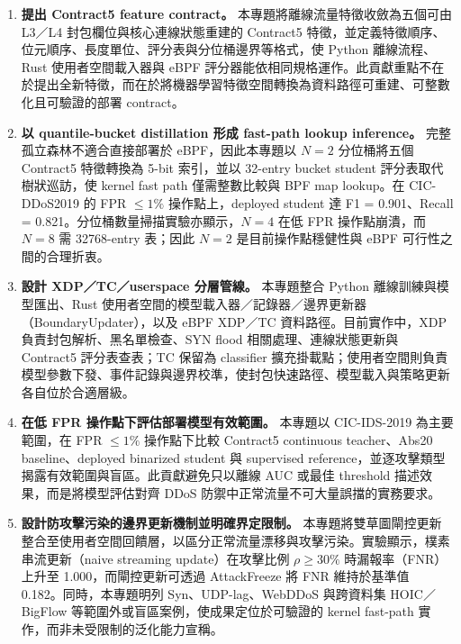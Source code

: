 \documentclass[12pt, a4paper, fontset=none]{ctexart}
\begin{document}
\begin{enumerate}
  \item \textbf{提出 Contract5 feature contract。} 本專題將離線流量特徵收斂為五個可由 L3／L4 封包欄位與核心連線狀態重建的 Contract5 特徵，並定義特徵順序、位元順序、長度單位、評分表與分位桶邊界等格式，使 Python 離線流程、Rust 使用者空間載入器與 eBPF 評分器能依相同規格運作。此貢獻重點不在於提出全新特徵，而在於將機器學習特徵空間轉換為資料路徑可重建、可整數化且可驗證的部署 contract。

  \item \textbf{以 quantile-bucket distillation 形成 fast-path lookup inference。} 完整孤立森林不適合直接部署於 eBPF，因此本專題以 $N=2$ 分位桶將五個 Contract5 特徵轉換為 5-bit 索引，並以 32-entry bucket student 評分表取代樹狀巡訪，使 kernel fast path 僅需整數比較與 BPF map lookup。在 CIC-DDoS2019 的 FPR $\leq 1\%$ 操作點上，deployed student 達 F1 = 0.901、Recall = 0.821。分位桶數量掃描實驗亦顯示，$N=4$ 在低 FPR 操作點崩潰，而 $N=8$ 需 32768-entry 表；因此 $N=2$ 是目前操作點穩健性與 eBPF 可行性之間的合理折衷。

  \item \textbf{設計 XDP／TC／userspace 分層管線。} 本專題整合 Python 離線訓練與模型匯出、Rust 使用者空間的模型載入器／記錄器／邊界更新器（BoundaryUpdater），以及 eBPF XDP／TC 資料路徑。目前實作中，XDP 負責封包解析、黑名單檢查、SYN flood 相關處理、連線狀態更新與 Contract5 評分表查表；TC 保留為 classifier 擴充掛載點；使用者空間則負責模型參數下發、事件記錄與邊界校準，使封包快速路徑、模型載入與策略更新各自位於合適層級。

  \item \textbf{在低 FPR 操作點下評估部署模型有效範圍。} 本專題以 CIC-IDS-2019 為主要範圍，在 FPR $\leq 1\%$ 操作點下比較 Contract5 continuous teacher、Abs20 baseline、deployed binarized student 與 supervised reference，並逐攻擊類型揭露有效範圍與盲區。此貢獻避免只以離線 AUC 或最佳 threshold 描述效果，而是將模型評估對齊 DDoS 防禦中正常流量不可大量誤擋的實務要求。

  \item \textbf{設計防攻擊污染的邊界更新機制並明確界定限制。} 本專題將雙草圖閘控更新整合至使用者空間回饋層，以區分正常流量漂移與攻擊污染。實驗顯示，樸素串流更新（naive streaming update）在攻擊比例 $\rho \geq 30\%$ 時漏報率（FNR）上升至 1.000，而閘控更新可透過 AttackFreeze 將 FNR 維持於基準值 0.182。同時，本專題明列 Syn、UDP-lag、WebDDoS 與跨資料集 HOIC／BigFlow 等範圍外或盲區案例，使成果定位於可驗證的 kernel fast-path 實作，而非未受限制的泛化能力宣稱。
\end{enumerate}
\end{document}
